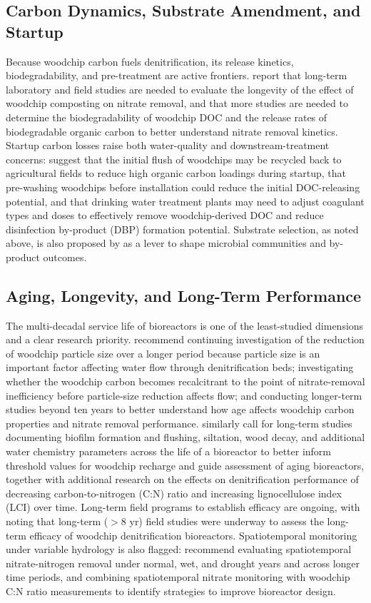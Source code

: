 \subsection{Carbon Dynamics, Substrate Amendment, and Startup}
Because woodchip carbon fuels denitrification, its release kinetics, biodegradability, and pre-treatment are active frontiers. \textcite{Kouanda2021} report that long-term laboratory and field studies are needed to evaluate the longevity of the effect of woodchip composting on nitrate removal, and that more studies are needed to determine the biodegradability of woodchip DOC and the release rates of biodegradable organic carbon to better understand nitrate removal kinetics. Startup carbon losses raise both water-quality and downstream-treatment concerns: \textcite{Abusallout2017} suggest that the initial flush of woodchips may be recycled back to agricultural fields to reduce high organic carbon loadings during startup, that pre-washing woodchips before installation could reduce the initial DOC-releasing potential, and that drinking water treatment plants may need to adjust coagulant types and doses to effectively remove woodchip-derived DOC and reduce disinfection by-product (DBP) formation potential. Substrate selection, as noted above, is also proposed by \textcite{Hartfiel2022} as a lever to shape microbial communities and by-product outcomes.

\subsection{Aging, Longevity, and Long-Term Performance}
The multi-decadal service life of bioreactors is one of the least-studied dimensions and a clear research priority. \textcite{Ghane2018} recommend continuing investigation of the reduction of woodchip particle size over a longer period because particle size is an important factor affecting water flow through denitrification beds; investigating whether the woodchip carbon becomes recalcitrant to the point of nitrate-removal inefficiency before particle-size reduction affects flow; and conducting longer-term studies beyond ten years to better understand how age affects woodchip carbon properties and nitrate removal performance. \textcite{Christianson2020} similarly call for long-term studies documenting biofilm formation and flushing, siltation, wood decay, and additional water chemistry parameters across the life of a bioreactor to better inform threshold values for woodchip recharge and guide assessment of aging bioreactors, together with additional research on the effects on denitrification performance of decreasing carbon-to-nitrogen (C:N) ratio and increasing lignocellulose index (LCI) over time. Long-term field programs to establish efficacy are ongoing, with \textcite{Greenan2009} noting that long-term ($>$8 yr) field studies were underway to assess the long-term efficacy of woodchip denitrification bioreactors. Spatiotemporal monitoring under variable hydrology is also flagged: \textcite{Hartfiel2023b} recommend evaluating spatiotemporal nitrate-nitrogen removal under normal, wet, and drought years and across longer time periods, and combining spatiotemporal nitrate monitoring with woodchip C:N ratio measurements to identify strategies to improve bioreactor design.

